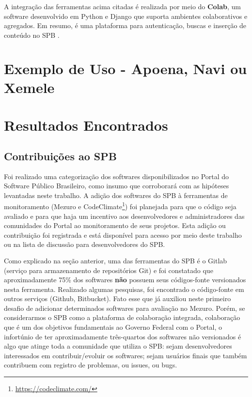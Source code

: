 A integração das ferramentas acima citadas é realizada por meio do
\textbf{Colab}, um software desenvolvido em Python e Django que suporta
ambientes colaborativos e agregados. Em resumo, é uma plataforma para
autenticação, buscas e inserção de conteúdo no SPB \cite{aboutSPB}.

\section{Exemplo de Uso - Apoena, Navi ou Xemele}

\section{Resultados Encontrados}

\subsection{Contribuições ao SPB}

Foi realizado uma categorização dos softwares disponibilizados no Portal do
Software Público Brasileiro, como insumo que corroborará com as hipóteses
levantadas neste trabalho. A adição dos softwares do SPB à ferramentas de
monitoramento (Mezuro e CodeClimate\footnote{\url{https://codeclimate.com/}})
foi planejada para que o código seja avaliado e para que haja um incentivo aos
desenvolvedores e administradores das comunidades do Portal ao monitoramento de
seus projetos. Esta adição ou contribuição foi registrada e está disponível
para acesso por meio deste trabalho ou na lista de discussão para
desenvolvedores do SPB.

Como explicado na seção anterior, uma das ferramentas do SPB é o Gitlab
(serviço para armazenamento de repositórios Git) e foi constatado que
aproximadamente 75\% dos softwares \textbf{não} possuem seus códigos-fonte
versionados nesta ferramenta. Realizado algumas pesquisas, foi encontrado o
código-fonte em outros serviços (Github, Bitbucket). Fato esse que já auxiliou
neste primeiro desafio de adicionar determinados softwares para avaliação no
Mezuro. Porém, se considerarmos o SPB como a plataforma de colaboração
integrada, colaboração que é um dos objetivos fundamentais ao Governo Federal
com o Portal, o infortúnio de ter aproximadamente três-quartos dos softwares
não versionados é algo que atinge toda a comunidade que utiliza o SPB: sejam
desenvolvedores interessados em contribuir/evoluir os softwares; sejam usuários
finais que também contribuem com registro de problemas, ou issues, ou bugs.

